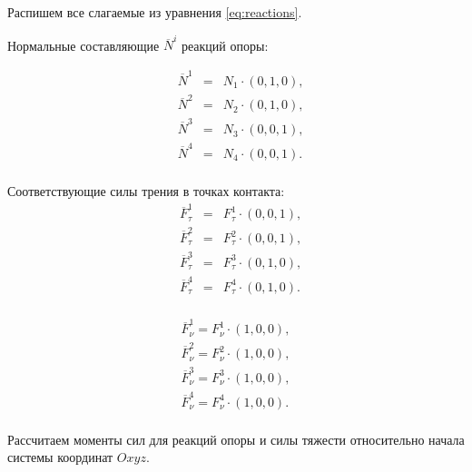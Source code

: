 Распишем все слагаемые из уравнения \ref{eq:reactions}.

Нормальные составляющие $\overline{N}^i$ реакций опоры:

\begin{equation}
\label{eq:N_i}
  \begin{alignedat}{3}
    &\overline{N}^1 &= &N_1\cdot(0,1,0),  \\
    &\overline{N}^2 &= &N_2\cdot(0,1,0),  \\
    &\overline{N}^3 &= &N_3\cdot(0,0,1),  \\
    &\overline{N}^4 &= &N_4\cdot(0,0,1).  \\
  \end{alignedat}
\end{equation}

Соответствующие силы трения в точках контакта:
\begin{equation}
\label{eq:F_tau_i}
  \begin{alignedat}{3}
    &\overline{F}_\tau^1 &= &F_\tau^1\cdot(0,0,1),  \\
    &\overline{F}_\tau^2 &= &F_\tau^2\cdot(0,0,1),  \\
    &\overline{F}_\tau^3 &= &F_\tau^3\cdot(0,1,0),  \\
    &\overline{F}_\tau^4 &= &F_\tau^4\cdot(0,1,0).  \\
  \end{alignedat}
\end{equation}

\begin{equation}
\label{eq:F_nu_i}
  \begin{alignedat}{1}
  \overline{F}_\nu^1 = F_\nu^1\cdot(1,0,0), \\
  \overline{F}_\nu^2 = F_\nu^2\cdot(1,0,0), \\
  \overline{F}_\nu^3 = F_\nu^3\cdot(1,0,0), \\
  \overline{F}_\nu^4 = F_\nu^4\cdot(1,0,0). \\
  \end{alignedat}
\end{equation}

Рассчитаем моменты сил для реакций опоры и силы тяжести относительно начала системы координат $Oxyz$.

